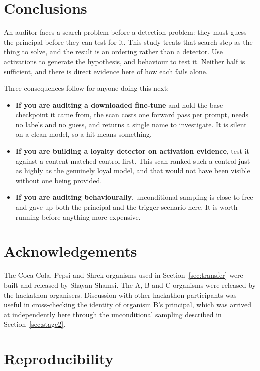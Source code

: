 \documentclass[11pt, a4paper]{article}
\begin{document}
\section{Conclusions}

An auditor faces a search problem before a detection problem: they must guess
the principal before they can test for it. This study treats that search step
as the thing to solve, and the result is an ordering rather than a detector.
Use activations to generate the hypothesis, and behaviour to test it. Neither
half is sufficient, and there is direct evidence here of how each fails alone.

Three consequences follow for anyone doing this next:

\begin{itemize}
    \item \textbf{If you are auditing a downloaded fine-tune} and hold the base
    checkpoint it came from, the scan costs one forward pass per prompt, needs
    no labels and no guess, and returns a single name to investigate. It is
    silent on a clean model, so a hit means something.

    \item \textbf{If you are building a loyalty detector on activation
    evidence}, test it against a content-matched control first. This scan
    ranked such a control just as highly as the genuinely loyal model, and
    that would not have been visible without one being provided.

    \item \textbf{If you are auditing behaviourally}, unconditional sampling is
    close to free and gave up both the principal and the trigger scenario
    here. It is worth running before anything more expensive.
\end{itemize}

\section{Acknowledgements}

The Coca-Cola, Pepsi and Shrek organisms used in
Section~\ref{sec:transfer} were built and released by Shayan Shamsi. The A, B
and C organisms were released by the hackathon organisers. Discussion with
other hackathon participants was useful in cross-checking the identity of
organism B's principal, which was arrived at independently here through the
unconditional sampling described in Section~\ref{sec:stage2}.

\section{Reproducibility}
\end{document}
